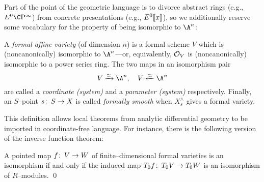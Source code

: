 Part of the point of the geometric language is to divorce abstract rings (e.g., \(E^0 \CP^\infty\)) from concrete presentations (e.g., \(E^0\llbracket{x}\rrbracket\)), so we additionally reserve some vocabulary for the property of being isomorphic to \(\A^n\):
\begin{definition}\label{DefnFormalVariety}
A \textit{formal affine variety} (of dimension \(n\)) is a formal scheme \(V\) which is (noncanonically) isomorphic to \(\A^n\)---or, equivalently, \(\mathcal{O}_V\) is (noncanonically) isomorphic to a power series ring.  The two maps in an isomorphism pair \[V \xrightarrow{\simeq} \A^n, \quad V \xleftarrow{\simeq} \A^n\] are called a \textit{coordinate (system)} and a \textit{parameter (system)} respectively.  Finally, an \(S\)--point \(s\colon\thinspace S \to X\) is called \textit{formally smooth} when \(X^\wedge_s\) gives a formal variety.
\end{definition}

This definition allows local theorems from analytic differential geometry to be imported in coordinate-free language.  For instance, there is the following version of the inverse function theorem:
\begin{theorem}\label{InverseFunctionTheoremForFVars}
A pointed map \(f\colon\thinspace V \to W\) of finite--dimensional formal varieties is an isomorphism if and only if the induced map \(T_0 f\colon\thinspace T_0 V \to T_0 W\) is an isomorphism of \(R\)--modules. \qed
\end{theorem}

